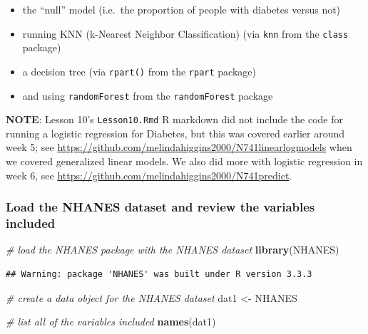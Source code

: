 \documentclass[]{article}
\newenvironment{Shaded}{\begin{snugshade}}{\end{snugshade}}
\newcommand{\KeywordTok}[1]{\textcolor[rgb]{0.13,0.29,0.53}{\textbf{{#1}}}}
\newcommand{\StringTok}[1]{\textcolor[rgb]{0.31,0.60,0.02}{{#1}}}
\newcommand{\CommentTok}[1]{\textcolor[rgb]{0.56,0.35,0.01}{\textit{{#1}}}}
\newcommand{\NormalTok}[1]{{#1}}
\providecommand{\tightlist}{%
  \setlength{\itemsep}{0pt}\setlength{\parskip}{0pt}}
\begin{document}
\begin{itemize}
\tightlist
\item
  the ``null'' model (i.e.~the proportion of people with diabetes versus
  not)
\item
  running KNN (k-Nearest Neighbor Classification) (via \texttt{knn} from
  the \texttt{class} package)
\item
  a decision tree (via \texttt{rpart()} from the \texttt{rpart} package)
\item
  and using \texttt{randomForest} from the \texttt{randomForest} package
\end{itemize}

\textbf{NOTE}: Lesson 10's \texttt{Lesson10.Rmd} R markdown did not
include the code for running a logistic regression for Diabetes, but
this was covered earlier around week 5; see
\url{https://github.com/melindahiggins2000/N741linearlogmodels} when we
covered generalized linear models. We also did more with logistic
regression in week 6, see
\url{https://github.com/melindahiggins2000/N741predict}.

\subsubsection{Load the NHANES dataset and review the variables
included}\label{load-the-nhanes-dataset-and-review-the-variables-included}

\begin{Shaded}
\begin{Highlighting}[]
\CommentTok{# load the NHANES package with the NHANES dataset}
\KeywordTok{library}\NormalTok{(NHANES)}
\end{Highlighting}
\end{Shaded}

\begin{verbatim}
## Warning: package 'NHANES' was built under R version 3.3.3
\end{verbatim}

\begin{Shaded}
\begin{Highlighting}[]
\CommentTok{# create a data object for the NHANES dataset}
\NormalTok{dat1 <-}\StringTok{ }\NormalTok{NHANES}

\CommentTok{# list all of the variables included}
\KeywordTok{names}\NormalTok{(dat1)}
\end{Highlighting}
\end{Shaded}
\end{document}
